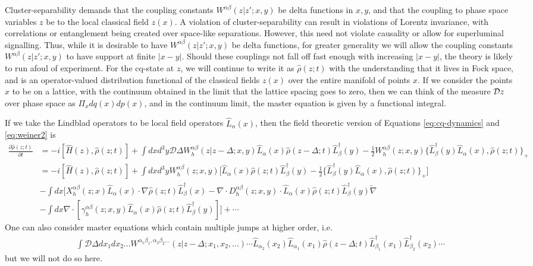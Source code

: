 \documentclass[aps,pra,showpacs,citeautoscript,amsmath,amssymb,floatfix,superscriptaddress,bbm, verbatim,amsfonts,changes,10pt,nofootinbib,longbibliography]{revtex4-1}
\def\z{{z}}
\def\L{{\hat{L}}}
\def\Hq{\hat{H}}
\def\dist{{\Delta}}
\def\ddf{{\mathcal D}\dist}
\def\rate{{W}}
\def\ab{^{\alpha\beta}}
\def\lax{{\L_\alpha(x)}}
\def\lbx{{\L^\dagger_\beta(x)}}
\def\lby{{\L^\dagger_\beta(y)}}
\def\rateabx{{\rate\ab(\z|\z';x,y)}}
\def\rateabxd{{\rate_h\ab(\z|\z-\dist;x,y)}}
\renewcommand{\varrho}{\hat{\rho}}
\def\psiz{{\varrho(\z;t)}}
\def\psizt{{\varrho(\z;t)}}
\def\psizd{{\varrho(\z-\dist;t)}}
\def\friction{\gamma}
\begin{document}
Cluster-separability\cite{cluster_foot} demands that 
the coupling constants $\rateabx$ be delta functions in $x,y$\cite{bps}, and that the coupling to phase space variables $\z$ be to the local classical field $\z(x)$. A violation of cluster-separability can result in violations of Lorentz invariance, with correlations or entanglement being created over space-like separations. However, this need not violate causality or allow for superluminal signalling\cite{OR-intrinsic}. Thus, while it is desirable to have $\rateabx$ be delta functions,  for greater generality we will allow the coupling constants $\rateabx$ to have support at finite $|x-y|$. Should these couplings not fall off fast enough with increasing $|x-y|$, the theory is likely to run afoul of experiment.
For the cq-state at $\z$, we will continue to write it as $\psizt$ with the understanding that it lives in Fock space, and is an operator-valued distribution functional of the classical fields $\z(x)$ over the entire manifold of points $x$. If we consider the points $x$ to be on a lattice, with the continuum obtained in the limit that the lattice spacing goes to zero, then we can think of the measure ${\cal D}\z$ over phase space as $\Pi_xdq(x)dp(x)$, and in the continuum limit, the master equation is given by a functional integral. 




If we take the Lindblad operators to be local field operators $\lax$, then the field theoretic version of Equations \eqref{eq:cq-dynamics} and \eqref{eq:weiner2} is 
\begin{align}
  \frac{\partial\psiz}{\partial t}
  &=-i[\Hq(\z),\psiz]
 + \int dxd^3y\ddf
\rateabxd
\L_{\alpha}(x)\psizd\L_{\beta}^\dagger(y)
  -
\frac{1}{2}\rate_h\ab(\z;x,y)\{\lby\lax,\psiz\}_+   
\\
  &=-i[\Hq(\z),\psiz]
 + 
 \int dx d^3y
\rate_h\ab(\z;x,y)\Big[ \lax\psiz\lby
  -\frac{1}{2}
\{\L_{\beta}^\dagger(y)\L_{\alpha}(x),\psiz\}_+   
\Big]
\nonumber\\
&
-
\int dx  
\Big[  X^{\alpha\beta}_h(\z;x)
\lax\cdot\nabla \psiz\lbx
- \nabla\cdot D_h^{\alpha\beta}(\z;x,y)\cdot
\L_{\alpha}(x)
\psiz
\L_{\beta}^\dagger(y)
\overleftarrow{\nabla}\nonumber\\
&
-\int dx\nabla\cdot[
\friction^{\alpha\beta}_h(\z;x,y)
\lax\psiz\lby]
  \Big] +\cdots  
\label{eq:weinerfields}
\end{align}
One can also consider master equations which contain multiple jumps at higher order, i.e.
	\begin{align}
		\int \ddf dx_1 dx_2... \rate^{\alpha_1\beta_1,\alpha_2\beta_2...}(\z|\z-\dist;x_1,x_2,...)\cdots\L_{\alpha_2}(x_2)\L_{\alpha_1}(x_1)\psizd\L^\dagger_{\beta_1}(x_1)\L^\dagger_{\beta_2}(x_2)\cdots
		\nonumber
	\end{align}  but we will not do so here.
\end{document}
